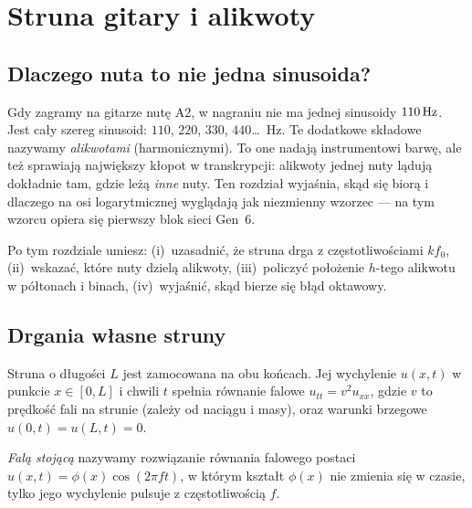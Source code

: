 \chapter{Struna gitary i alikwoty}\label{rozdz:alikwoty}

\section{Dlaczego nuta to nie jedna sinusoida?}

Gdy zagramy na gitarze nutę A2, w nagraniu nie ma jednej sinusoidy $110\,\mathrm{Hz}$. Jest cały szereg sinusoid:
$110$, $220$, $330$, $440$\dots\ Hz. Te dodatkowe składowe nazywamy \emph{alikwotami} (harmonicznymi).
To one nadają instrumentowi barwę, ale też sprawiają największy kłopot w transkrypcji: alikwoty jednej nuty
lądują dokładnie tam, gdzie leżą \emph{inne} nuty. Ten rozdział wyjaśnia, skąd się biorą i dlaczego
na osi logarytmicznej wyglądają jak niezmienny wzorzec --- na tym wzorcu opiera się pierwszy blok sieci Gen~6.

Po tym rozdziale umiesz: (i)~uzasadnić, że struna drga z częstotliwościami $kf_0$, (ii)~wskazać, które nuty
dzielą alikwoty, (iii)~policzyć położenie $h$-tego alikwotu w półtonach i binach, (iv)~wyjaśnić, skąd bierze się
błąd oktawowy.

\section{Drgania własne struny}

Struna o długości $L$ jest zamocowana na obu końcach. Jej wychylenie $u(x,t)$ w punkcie $x\in[0,L]$ i chwili $t$
spełnia równanie falowe $u_{tt}=v^2u_{xx}$, gdzie $v$ to prędkość fali na strunie (zależy od naciągu i masy),
oraz warunki brzegowe $u(0,t)=u(L,t)=0$.

\begin{definicja}\label{def:fala-stojaca}
\emph{Falą stojącą} nazywamy rozwiązanie równania falowego postaci $u(x,t)=\phi(x)\cos(2\pi ft)$, w którym
kształt $\phi(x)$ nie zmienia się w czasie, tylko jego wychylenie pulsuje z częstotliwością $f$.
\end{definicja}


